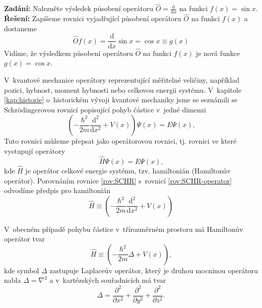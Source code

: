 \begin{priklad} \label{pr:Operator}
\textbf{Zadání:} Nalezněte výsledek působení operátoru $\hat{O}=\frac{\mathrm{d}}{\mathrm{d}x}$ na funkci $f(x) = \sin x$. \\
\textbf{Řešení:} Zapíšeme rovnici vyjadřující působení operátoru $\hat{O}$ na funkci $f(x)$ a dostaneme
\begin{displaymath}
\hat{O} f(x) = \frac{\mathrm{d}}{\mathrm{d}x} \sin x = \cos x \equiv g(x)
\end{displaymath}
Vidíme, že výsledkem působení operátoru $\hat{O}$ na funkci $f(x)$ je nová funkce $g(x) = \cos x$.
\end{priklad}

V~kvantové mechanice operátory reprezentující měřitelné veličiny, například pozici, hybnost, moment hybnosti nebo celkovou energii systému. V~kapitole \ref{kap:historie} o~historickém vývoji kvantové mechaniky jsme se seznámili se Schrödingerovou rovnicí popisující pohyb částice v~jedné dimenzi
\begin{equation}
\left( -\frac{\hbar^2}{2m}\frac{\mathrm{d}^2}{\mathrm{d} x^2} + V(x) \right) \Psi(x) = E \Psi(x) \mbox{,}
\label{rov:SCHR}
\end{equation}
Tuto rovnici můžeme přepsat jako operátorovou rovnici, tj. rovnici ve které vystupují operátory
\begin{equation}
\hat{H}\Psi(x) = E \Psi(x)\mbox{,}
\label{rov:SCHR-operator}
\end{equation}
kde $\hat{H}$ je operátor celkové energie systému, tzv. hamiltonián (Hamiltonův operátor). Porovnáním rovnice \eqref{rov:SCHR} s~rovnicí \eqref{rov:SCHR-operator} odvodíme předpis pro hamiltonián
\begin{equation}
\hat{H} \equiv \left( -\frac{\hbar^2}{2m}\frac{\mathrm{d}^2}{\mathrm{d} x^2} + V(x) \right)
\label{rov:Hamiltonian1D}
\end{equation}

V~obecném případě pohybu částice v~třírozměrném prostoru má Hamiltonův operátor tvar
\begin{equation}
\hat{H} \equiv \left( -\frac{\hbar^2}{2m}\Delta + V(x) \right) \mbox{,}
\label{rov:Hamiltonian3D}
\end{equation}
kde symbol $\Delta$ zastupuje Laplaceův operátor, který je druhou mocninou operátoru nabla $\Delta = \nabla^2$  a v~kartézských souřadnicích má tvar
\begin{equation}
\Delta = \frac{\partial^2}{\partial x^2}+\frac{\partial^2}{\partial y^2}+\frac{\partial^2}{\partial z^2} \mbox{.}
\label{rov:LaplaceuvOperator}
\end{equation}

